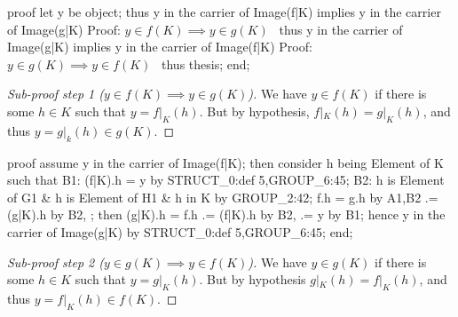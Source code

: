 \nwenddocs{}\endmoddef\nwstartdeflinemarkup{}\nwenddeflinemarkup
proof
  let y be object;
  thus y in the carrier of Image(f|K) implies y in the carrier of Image(g|K)
  \LA{}Proof: $y\in f(K)\implies y\in g(K)$~{\nwtagstyle{}}\RA{}
  thus y in the carrier of Image(g|K) implies y in the carrier of Image(f|K)
  \LA{}Proof: $y\in g(K)\implies y\in f(K)$~{\nwtagstyle{}}\RA{}
  thus thesis;
end;
\nwendcode{}\nwdocspar

\begin{proof}[Sub-proof step 1 ($y\in f(K)\implies y\in g(K)$)]
We have $y\in f(K)$ if there is some $h\in K$ such that $y=f|_{K}(h)$.
But by hypothesis, $f|_{K}(h)=g|_{K}(h)$, and thus $y=g|_{k}(h)\in g(K)$.
\end{proof}

\nwenddocs{}\endmoddef\nwstartdeflinemarkup{}\nwenddeflinemarkup
proof
  assume y in the carrier of Image(f|K);
  then consider h being Element of K such that
  B1: (f|K).h = y
  by STRUCT_0:def 5,GROUP_6:45;
  B2: h is Element of G1 & h is Element of H1 & h in K by GROUP_2:42;
  f.h = g.h by A1,B2
     .= (g|K).h by B2, ;
  then (g|K).h = f.h
              .= (f|K).h by B2,
              .= y by B1;
  hence y in the carrier of Image(g|K) by STRUCT_0:def 5,GROUP_6:45;
end;
\nwendcode{}\nwdocspar

\begin{proof}[Sub-proof step 2 ($y\in g(K)\implies y\in f(K)$)]
  We have $y\in g(K)$ if there is some $h\in K$ such that $y=g|_{K}(h)$.
  But by hypothesis $g|_{K}(h) = f|_{K}(h)$, and thus $y = f|_{K}(h)\in f(K)$.
\end{proof}

